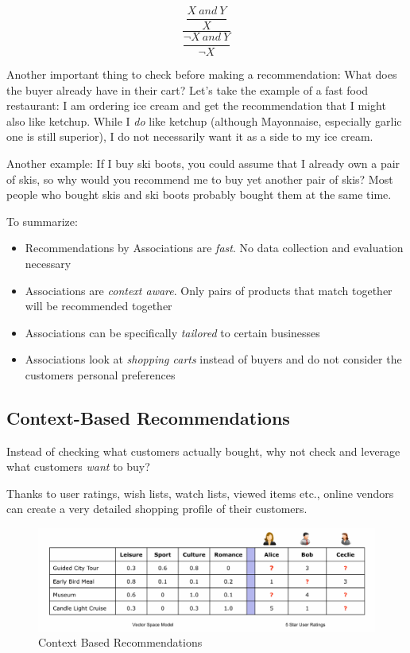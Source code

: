 \documentclass[11pt]{article}
\begin{document}
\begin{equation}
    \dfrac{\dfrac{X\ and\ Y}{X}}{\dfrac{\neg X\ and\ Y}{ \neg X}}
\end{equation}

\vspace{10px}

Another important thing to check before making a recommendation: What does the buyer already have in their cart? Let's take the example of a fast food restaurant: I am ordering ice cream and get the recommendation that I might also like ketchup. While I \textit{do} like ketchup (although Mayonnaise, especially garlic one is still superior), I do not necessarily want it as a side to my ice cream.

Another example: If I buy ski boots, you could assume that I already own a pair of skis, so why would you recommend me to buy yet another pair of skis? Most people who bought skis and ski boots probably bought them at the same time.

\vspace{10px}

To summarize:

\begin{itemize}
    \item Recommendations by Associations are \textit{fast}. No data collection and evaluation necessary
    \item Associations are \textit{context aware}. Only pairs of products that match together will be recommended together
    \item Associations can be specifically \textit{tailored} to certain businesses
    \item Associations look at \textit{shopping carts} instead of buyers and do not consider the customers personal preferences
\end{itemize}

\subsection{Context-Based Recommendations}

Instead of checking what customers actually bought, why not check and leverage what customers \textit{want} to buy?

Thanks to user ratings, wish lists, watch lists, viewed items etc., online vendors can create a very detailed shopping profile of their customers.

\begin{figure}[htb!]
    \centering
    \includegraphics[keepaspectratio=true, width=\linewidth]{context_based_recommendations.png}
    \caption{Context Based Recommendations}
    \label{fig:context_based_recommendations}
\end{figure}
\end{document}
